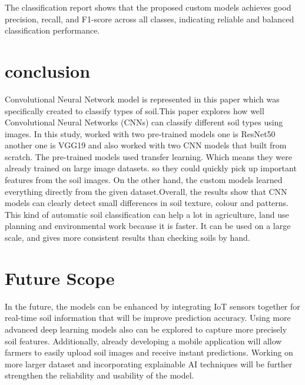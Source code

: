 \documentclass[conference]{IEEEtran}
\begin{document}
The classification report shows that the proposed custom models achieves good precision, recall, and F1-score across all classes, indicating reliable and balanced classification performance.


\section{conclusion}
Convolutional Neural Network model is represented in this paper which was specifically created to classify types of soil.This paper explores how well Convolutional Neural Networks (CNNs) can classify different soil types using images. In this study, worked with two pre-trained models one is ResNet50 another one is VGG19 and also worked with two CNN models that built from scratch. The pre-trained models used transfer learning. Which means they were already trained on large image datasets. so they could quickly pick up important features from the soil images. On the other hand, the custom models learned everything directly from the given dataset.Overall, the results show that CNN models can clearly detect small differences in soil texture, colour and patterns. This kind of automatic soil classification can help a lot in agriculture, land use planning and environmental work because it is faster. It can be used on a large scale, and gives more consistent results than checking soils by hand.

\section{Future Scope}
In the future, the models can be enhanced by integrating IoT sensors together for real-time soil information that will be improve prediction accuracy. Using more advanced deep learning models also can be explored to capture more precisely soil features. Additionally, already developing a mobile application will allow farmers to easily upload soil images and receive instant predictions. Working on more larger dataset and incorporating explainable AI techniques will be further strengthen the reliability and usability of the model.




\end{document}
